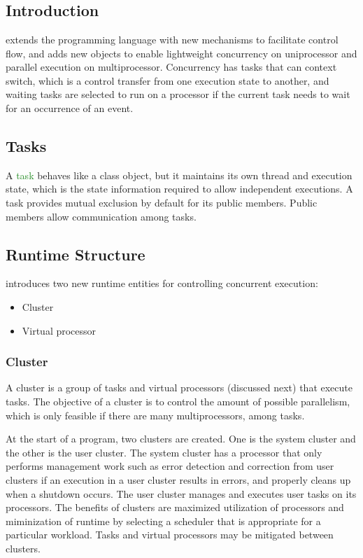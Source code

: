 \chapter{\uCPP} \label{uCPP}

\section{Introduction}
\uCPPS \cite{reference10} extends the \CCS programming language with new
mechanisms to
facilitate control flow, and adds new objects to enable lightweight concurrency
on uniprocessor and parallel execution on multiprocessor. Concurrency has tasks
that can context switch, which is a control transfer from one execution state to
another, and waiting tasks are selected to run on a processor if the current
task needs to wait for an occurrence of an event.

\section{Tasks}
A \textcolor{ForestGreen}{task} behaves like a class object, but it maintains its own
thread and execution state, which is the state information required to allow
independent executions. A task provides mutual exclusion by default for its
public members. Public members allow communication among tasks.

\section{\uCPPS Runtime Structure}
\uCPPS introduces two new runtime entities for controlling concurrent execution:
\begin{itemize}
    \item Cluster
    \item Virtual processor
\end{itemize}

\subsection{Cluster}
A cluster is a group of tasks and virtual processors (discussed next) that
execute tasks. The objective of a cluster is to control the amount of possible
parallelism, which is only feasible if there are many multiprocessors, among tasks.

At the start of a \uCPPS program, two clusters are created. One is the system
cluster and the other is the user cluster. The system cluster has a
processor that only performs management work such as error detection and
correction from user clusters if an execution in a user cluster results in errors,
and properly cleans up when a shutdown occurs. The user cluster manages and
executes user tasks on its processors. The benefits of clusters
are maximized utilization of processors and miminization of runtime by selecting
a scheduler that is appropriate for a particular workload. Tasks and virtual
processors may be mitigated between clusters.


